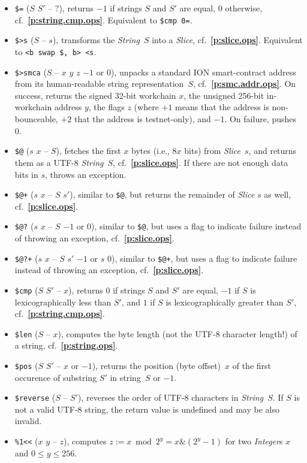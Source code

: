 \documentclass[12pt,oneside]{article}
\def\refpoint#1{{\rm\textbf{\ref{#1}}}}
\let\ptref=\refpoint
\begin{document}
\begin{itemize}
\item {\tt \$=} ($S$ $S'$ -- $?$), returns $-1$ if strings $S$ and $S'$ are equal, $0$ otherwise, cf.~\ptref{p:string.cmp.ops}. Equivalent to {\tt \$cmp 0=}.
\item {\tt \$>s} ($S$ -- $s$), transforms the {\em String\/}~$S$ into a {\em Slice}, cf.~\ptref{p:slice.ops}. Equivalent to {\tt <b swap \$, b> <s}.
\item {\tt \$>smca} ($S$ -- $x$ $y$ $z$ $-1$ or $0$), unpacks a standard ION smart-contract address from its human-readable string representation~$S$, cf.~\ptref{p:smc.addr.ops}. On success, returns the signed 32-bit workchain $x$, the unsigned 256-bit in-workchain address $y$, the flags $z$ (where $+1$ means that the address is non-bounceable, $+2$ that the address is testnet-only), and $-1$. On failure, pushes $0$.
\item {\tt \$@} ($s$ $x$ -- $S$), fetches the first $x$ bytes (i.e., $8x$ bits) from {\em Slice}~$s$, and returns them as a UTF-8 {\em String\/}~$S$, cf.~\ptref{p:slice.ops}. If there are not enough data bits in $s$, throws an exception.
\item {\tt \$@+} ($s$ $x$ -- $S$ $s'$), similar to {\tt \$@}, but returns the remainder of {\em Slice\/} $s$ as well, cf.~\ptref{p:slice.ops}.
\item {\tt \$@?} ($s$ $x$ -- $S$ $-1$ or $0$), similar to {\tt \$@}, but uses a flag to indicate failure instead of throwing an exception, cf.~\ptref{p:slice.ops}.
\item {\tt \$@?+} ($s$ $x$ -- $S$ $s'$ $-1$ or $s$ $0$), similar to {\tt \$@+}, but uses a flag to indicate failure instead of throwing an exception, cf.~\ptref{p:slice.ops}.
\item {\tt \$cmp} ($S$ $S'$ -- $x$), returns $0$ if strings $S$ and $S'$ are equal, $-1$ if $S$ is lexicographically less than $S'$, and $1$ if $S$ is lexicographically greater than $S'$, cf.~\ptref{p:string.cmp.ops}.
\item {\tt \$len} ($S$ -- $x$), computes the byte length (not the UTF-8 character length!) of a string, cf.~\ptref{p:string.ops}.
\item {\tt \$pos} ($S$ $S'$ -- $x$ or $-1$), returns the position (byte offset)~$x$ of the first occurence of substring $S'$ in string~$S$ or $-1$.
\item {\tt \$reverse} ($S$ -- $S'$), reverses the order of UTF-8 characters in {\em String\/}~$S$. If $S$ is not a valid UTF-8 string, the return value is undefined and may be also invalid.
\item {\tt \%1<{<}} ($x$ $y$ -- $z$), computes $z:=x\bmod 2^y=x\&(2^y-1)$ for two {\em Integer\/}s $x$ and $0\leq y\leq 256$.

\end{itemize}
\end{document}
